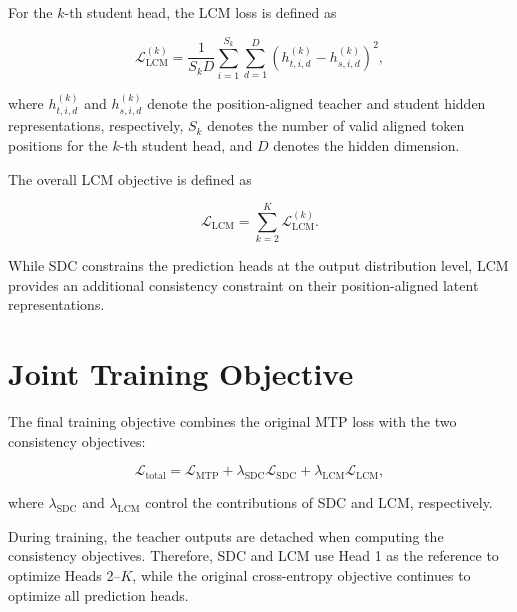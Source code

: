 For the $k$-th student head, the LCM loss is defined as

\begin{equation}
    \mathcal{L}_{\mathrm{LCM}}^{(k)}=\frac{1}{S_k D}\sum_{i=1}^{S_k}\sum_{d=1}^{D}\left(h_{t,i,d}^{(k)}-h_{s,i,d}^{(k)}\right)^2,
\end{equation}

where $h_{t,i,d}^{(k)}$ and $h_{s,i,d}^{(k)}$ denote the position-aligned teacher and student hidden representations, respectively, $S_k$ denotes the number of valid aligned token positions for the $k$-th student head, and $D$ denotes the hidden dimension.

The overall LCM objective is defined as

\begin{equation}
    \mathcal{L}_{\mathrm{LCM}}=\sum_{k=2}^{K}\mathcal{L}_{\mathrm{LCM}}^{(k)}.
\end{equation}

While SDC constrains the prediction heads at the output distribution level, LCM provides an additional consistency constraint on their position-aligned latent representations.
\section{Joint Training Objective}\label{sec:3-joint_training_objective}

The final training objective combines the original MTP loss with the two consistency objectives:

\begin{equation}\label{equ:joint_training_objective}
    \mathcal{L}_{\mathrm{total}} = \mathcal{L}_{\mathrm{MTP}} + \lambda_{\mathrm{SDC}}\mathcal{L}_{\mathrm{SDC}} + \lambda_{\mathrm{LCM}}\mathcal{L}_{\mathrm{LCM}},
\end{equation}

where $\lambda_{\mathrm{SDC}}$ and $\lambda_{\mathrm{LCM}}$ control the contributions of SDC and LCM, respectively.

During training, the teacher outputs are detached when computing the consistency objectives. Therefore, SDC and LCM use Head 1 as the reference to optimize Heads 2--$K$, while the original cross-entropy objective continues to optimize all prediction heads.
